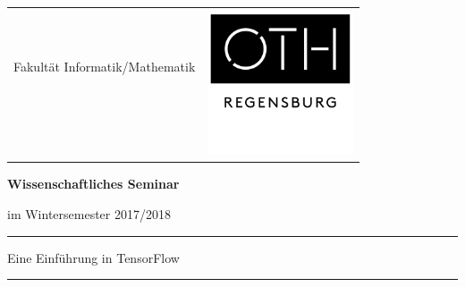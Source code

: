 
\noindent \titlepage

\noindent \begin{center}
\begin{tabular}{cc}
 & \multirow{5}{*}{\includegraphics[height=4.3cm]{images/OTH_Regensburg_neues_Logo_01}}\tabularnewline
{\large{}Fakultät Informatik/Mathematik}\hspace{3.0cm} & \tabularnewline
 & \tabularnewline
 & \tabularnewline
 & \tabularnewline
\end{tabular}
\par\end{center}

\noindent \vspace{2.0cm}


\begin{center}
\textbf{\Large{Wissenschaftliches Seminar}}
\par\end{center}{\Large \par}
\begin{center}
im Wintersemester 2017/2018
\end{center}

\noindent
\rule{\textwidth}{0.3pt}

\begin{doublespace}
\noindent \begin{center}
\Large{Eine Einführung in TensorFlow}
\par\end{center}{\large \par}
\end{doublespace}
\noindent\rule{\textwidth}{0.3pt}


\vspace{1.3cm}

\noindent \begin{flushleft}
{\Large{}
}
\par\end{flushleft}{\Large \par}

